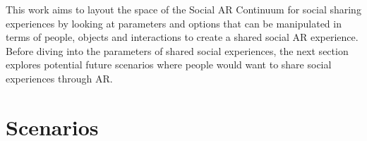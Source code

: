 

This work aims to layout the space of the Social AR Continuum for social sharing experiences by looking at parameters and options that can be manipulated in terms of people, objects and interactions to create a shared social AR experience. Before diving into the parameters of shared social experiences, the next section explores potential future scenarios where people would want to share social experiences through AR.

\pagebreak
\section{Scenarios}


